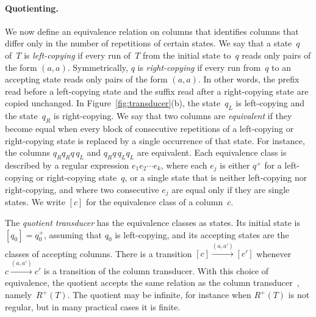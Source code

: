 \paragraph{Quotienting.}
We now define an equivalence relation on columns that identifies columns
that differ only in the number of repetitions of certain states. We say that
a state~$q$ of~$T$ is \emph{left-copying} if every run of~$T$ from the
initial state to~$q$ reads only pairs of the form $(a,a)$. Symmetrically, $q$
is \emph{right-copying} if every run from~$q$ to an accepting state reads only
pairs of the form $(a,a)$. In other words, the prefix read before a
left-copying state and the suffix read after a right-copying state are copied
unchanged. In Figure~\ref{fig:transducer}(b), the state~$q_L$ is left-copying
and the state~$q_R$ is right-copying. We say that two columns are
\emph{equivalent} if they become equal when every block of consecutive
repetitions of a left-copying or right-copying state is replaced by a single
occurrence of that state. For instance, the columns $q_R q_R q\, q_L$ and $q_R
q\, q_L q_L$ are equivalent. Each equivalence class is described by a regular
expression $e_1 e_2 \cdots e_k$, where each $e_j$ is either $q^+$ for a
left-copying or right-copying state~$q$, or a single state that is neither
left-copying nor right-copying, and where two consecutive $e_j$ are equal only
if they are single states. We write $[c]$ for the equivalence class of a
column~$c$.

The \emph{quotient transducer} has the equivalence classes as states. Its
initial state is $[q_0] = q_0^+$, assuming that $q_0$ is left-copying, and its
accepting states are the classes of accepting columns. There is a transition
$[c] \xrightarrow{(a,a')} [c']$ whenever $c \xrightarrow{(a,a')} c'$ is a
transition of the column transducer. With this choice of equivalence, the
quotient accepts the same relation as the column transducer~\cite{AJNO02},
namely~$R^+(T)$. The quotient may be infinite, for instance when $R^+(T)$ is
not regular, but in many practical cases it is finite.


